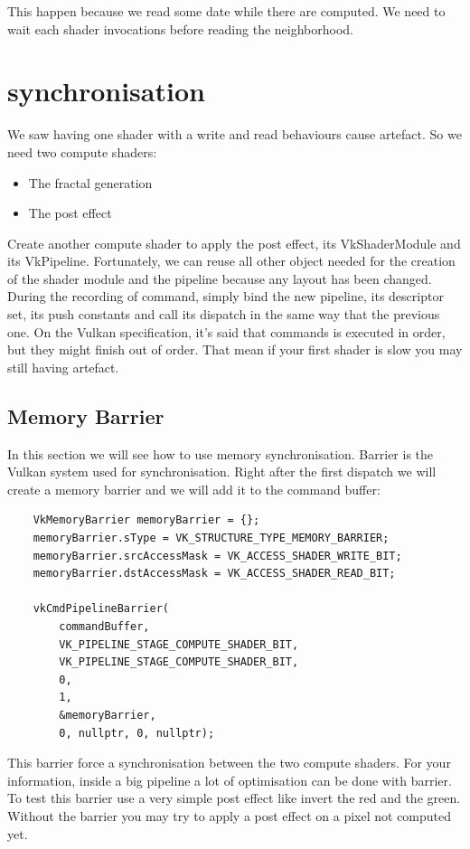\documentclass{article}
\begin{document}
This happen because we read some date while there are computed. We need to wait each shader invocations before reading the neighborhood.

\section{synchronisation}
We saw having one shader with a write and read behaviours cause artefact. So we need two compute shaders:

\begin{itemize}
	\item The fractal generation
	\item The post effect
\end{itemize}

Create another compute shader to apply the post effect, its VkShaderModule and its VkPipeline. Fortunately, we can reuse all other object needed for the creation of the shader module and the pipeline because any layout has been changed. During the recording of command, simply bind the new pipeline, its descriptor set, its push constants and call its dispatch in the same way that the previous one. On the Vulkan specification, it's said that commands is executed in order, but they might finish out of order. That mean if your first shader is slow you may still having artefact.

\subsection{Memory Barrier}
In this section we will see how to use memory synchronisation. Barrier is the Vulkan system used for synchronisation. Right after the first dispatch we will create a memory barrier and we will add it to the command buffer:

\begin{lstlisting}
	VkMemoryBarrier memoryBarrier = {};
	memoryBarrier.sType = VK_STRUCTURE_TYPE_MEMORY_BARRIER;
	memoryBarrier.srcAccessMask = VK_ACCESS_SHADER_WRITE_BIT;
	memoryBarrier.dstAccessMask = VK_ACCESS_SHADER_READ_BIT;

	vkCmdPipelineBarrier(
		commandBuffer,
		VK_PIPELINE_STAGE_COMPUTE_SHADER_BIT,
		VK_PIPELINE_STAGE_COMPUTE_SHADER_BIT,
		0,
		1,
		&memoryBarrier,
		0, nullptr, 0, nullptr);
\end{lstlisting}

This barrier force a synchronisation between the two compute shaders. For your information, inside a big pipeline a lot of optimisation can be done with barrier.\\
To test this barrier use a very simple post effect like invert the red and the green. Without the barrier you may try to apply a post effect on a pixel not computed yet.
\end{document}
